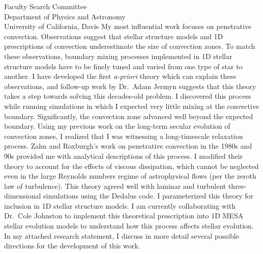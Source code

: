 \documentclass[12pt]{letter}
\begin{document}
\begin{letter}{
               Faculty Search Committee \\
               Department of Physics and Astronomy \\
               University of California, Davis 
           }
    My most influential work focuses on penetrative convection.
    Observations suggest that stellar structure models and 1D prescriptions of convection underestimate the size of convection zones.
    To match these observations, boundary mixing processes implemented in 1D stellar structure models have to be finely tuned and varied from one type of star to another.
    I have developed the first \emph{a-priori} theory which can explain these observations, and follow-up work by Dr.~Adam Jermyn suggests that this theory takes a step towards solving this decades-old problem.
    I discovered this process while running simulations in which I expected very little mixing at the convective boundary.
    Significantly, the convection zone advanced well beyond the expected boundary.
    Using my previous work on the long-term secular evolution of convection zones, I realized that I was witnessing a long-timescale relaxation process.
    Zahn and Roxburgh's work on penetrative convection in the 1980s and 90s provided me with analytical descriptions of this process.
    I modified their theory to account for the effects of viscous dissipation, which cannot be neglected even in the large Reynolds numbers regime of astrophysical flows (per the zeroth law of turbulence).
    This theory agreed well with laminar and turbulent three-dimensional simulations using the Dedalus code.
    I parameterized this theory for inclusion in 1D stellar structure models.
    I am currently collaborating with Dr.~Cole Johnston to implement this theoretical prescription into 1D MESA stellar evolution models to understand how this process affects stellar evolution.
    In my attached research statement, I discuss in more detail several possible directions for the development of this work.


\end{letter}
\end{document}

